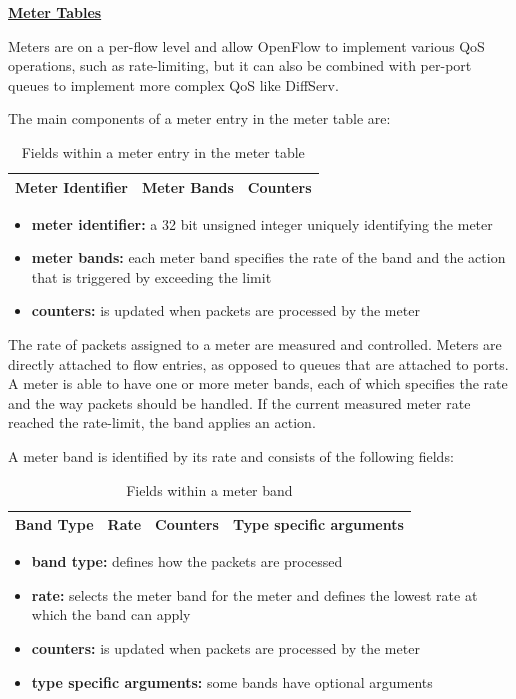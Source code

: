 \underline{\textbf{Meter Tables}}

Meters are on a per-flow level and allow OpenFlow to implement various QoS operations, such as rate-limiting, but it can also be combined with per-port queues to implement more complex QoS like DiffServ.

The main components of a meter entry in the meter table are:

\begin{table}[H]
\centering

\begin{tabular}{|c|c|c|}
\hline Meter Identifier & Meter Bands & Counters \\ 
\hline 
\end{tabular} 

\caption{Fields within a meter entry in the meter table}
\end{table}

\begin{itemize}
\item \textbf{meter identifier:} a 32 bit unsigned integer uniquely identifying the meter
\item \textbf{meter bands:} each meter band specifies the rate of the band and the action that is triggered by exceeding the limit
\item \textbf{counters:} is updated when packets are processed by the meter
\end{itemize}

The rate of packets assigned to a meter are measured and controlled. Meters are directly attached to flow entries, as opposed to queues that are attached to ports. A meter is able to have one or more meter bands, each of which specifies the rate and the way packets should be handled. If the current measured meter rate reached the rate-limit, the band applies an action. 

A meter band is identified by its rate and consists of the following fields:

\begin{table}[H]
\centering

\begin{tabular}{|c|c|c|c|}
\hline Band Type & Rate & Counters & Type specific arguments \\ 
\hline 
\end{tabular} 

\caption{Fields within a meter band}
\end{table}

\begin{itemize}
\item \textbf{band type:} defines how the packets are processed
\item \textbf{rate:} selects the meter band for the meter and defines the lowest rate at which the band can apply
\item \textbf{counters:} is updated when packets are processed by the meter
\item \textbf{type specific arguments:} some bands have optional arguments
\end{itemize}

